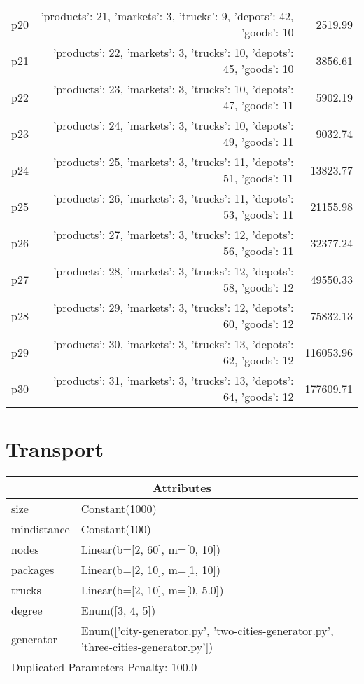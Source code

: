 \documentclass{article}
\begin{document}
\begin{center}
\begin{tabular}{@{}l|r|r@{}}
  p20&{'products': 21, 'markets': 3, 'trucks': 9, 'depots': 42, 'goods': 10}&2519.99\\
  p21&{'products': 22, 'markets': 3, 'trucks': 10, 'depots': 45, 'goods': 10}&3856.61\\
  p22&{'products': 23, 'markets': 3, 'trucks': 10, 'depots': 47, 'goods': 11}&5902.19\\
  p23&{'products': 24, 'markets': 3, 'trucks': 10, 'depots': 49, 'goods': 11}&9032.74\\
  p24&{'products': 25, 'markets': 3, 'trucks': 11, 'depots': 51, 'goods': 11}&13823.77\\
  p25&{'products': 26, 'markets': 3, 'trucks': 11, 'depots': 53, 'goods': 11}&21155.98\\
  p26&{'products': 27, 'markets': 3, 'trucks': 12, 'depots': 56, 'goods': 11}&32377.24\\
  p27&{'products': 28, 'markets': 3, 'trucks': 12, 'depots': 58, 'goods': 12}&49550.33\\
  p28&{'products': 29, 'markets': 3, 'trucks': 12, 'depots': 60, 'goods': 12}&75832.13\\
  p29&{'products': 30, 'markets': 3, 'trucks': 13, 'depots': 62, 'goods': 12}&116053.96\\
  p30&{'products': 31, 'markets': 3, 'trucks': 13, 'depots': 64, 'goods': 12}&177609.71
                            \end{tabular}
                            \end{center}
                    
                            \newpage \section{Transport}
                    \begin{center}
                    \begin{tabular}{@{}p{}p{}@{}}
                    \multicolumn{2}{c}{\bf \large Attributes}\\\midrule
                    size & Constant(1000)\\
mindistance & Constant(100)\\
nodes & Linear(b=[2, 60], m=[0, 10])\\
packages & Linear(b=[2, 10], m=[1, 10])\\
trucks & Linear(b=[2, 10], m=[0, 5.0])\\
degree & Enum([3, 4, 5])\\
generator & Enum(['city-generator.py', 'two-cities-generator.py', 'three-cities-generator.py']) \\\midrule
                    \multicolumn{2}{l}{Duplicated Parameters Penalty: 100.0}
                    \end{tabular}
                    \end{center}
                
\end{document}
